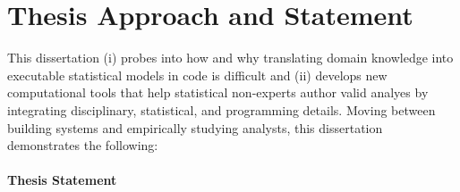 



\begin{comment}
One naive approach....
The naive approach would be to provide analysts with software that automatically tells them which analyses to use.

But that approach is not enough. Therefore, we should look at fundamentally
changing how we write code -- evolution vs. revolution? 
\end{comment}

\section{Thesis Approach and Statement}


This dissertation (i) probes into how and why translating domain knowledge into
executable statistical models in code is difficult and (ii) develops new
computational tools that help statistical non-experts author valid analyes by
integrating disciplinary, statistical, and programming details. Moving between
building systems and empirically studying analysts, this dissertation
demonstrates the following:%
\paragraph{Thesis Statement} \label{para:thesisStatement}

